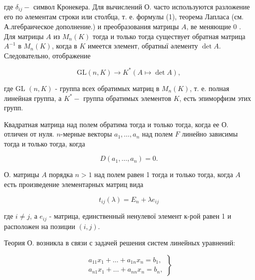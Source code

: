 \documentclass[10pt]{article}
\begin{document}
где $\delta_{i j}-$ символ Кронекера. Для вычислений О. часто используются разложение его по әлементам строки или столбца, т. е. формулы (1), теорема Лапласа (см. А.лгебраическое дополнение.) и преобразования матрицы $A$, ве меняющие 0 . Для матрицы $A$ из $M_{n}(K)$ тогда и только тогда существует обратная матрица $A^{-1}$ в $M_{n}(K)$, когда в $K$ имеется элемент, обратныї әлементу $\operatorname{det} A$. Следовательно, отображение



\[

\mathrm{GL}(n, K) \longrightarrow K^{*}(A \mapsto \operatorname{det} A),

\]



где GL $(n, K)$ - группа всех обратимых матриц в $M_{n}(K)$, т. е. полная линейная группа, а $K^{*}-$ группа обратимых элементов $K$, есть эпиморфизм этих групп.



Квадратная матрица над полем обратима тогда и только тогда, когда ее О. отличен от нуля. $n$-мерные векторы $a_{1}, \ldots, a_{n}$ над полем $F$ линейно зависимы тогда и только тогда, когда



\[

D\left(a_{1}, \ldots, a_{n}\right)=0 .

\]



О. матрицы $A$ порядка $n>1$ над полем равен 1 тогда и только тогда, когда $A$ есть произведение элементарных матриц вида



\[

t_{i j}(\lambda)=E_{n}+\lambda e_{i j}

\]



где $i \neq j$, а $e_{i j}$ - матрица, единственный ненулевої элемент к-рой равен 1 и расположен на позиции $(i, j)$.



Теория О. возникла в связи с задачей решения систем линейных уравнений:



\[

\left.\begin{array}{c}

a_{11} x_{1}+\ldots+a_{1 n} x_{n}=b_{1}, \\

a_{n 1} x_{1}+\ldots+a_{n n} x_{n}=b_{n},

\end{array}\right\}

\]
\end{document}

